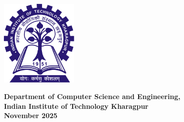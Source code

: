\begin{titlepage}
\begin{center}
    \vspace{0.2in}
    \begin{center}
        \includegraphics[width=1.5in]{Figures/logo.png}
    \end{center}
    \vspace{0.2in}
    {\Large\textbf{Department of Computer Science and Engineering,}}\medskip\\
    {\Large\textbf{Indian Institute of Technology Kharagpur}}\medskip\\
    {\large\textbf{November 2025}}
\end{center}
\end{titlepage}
